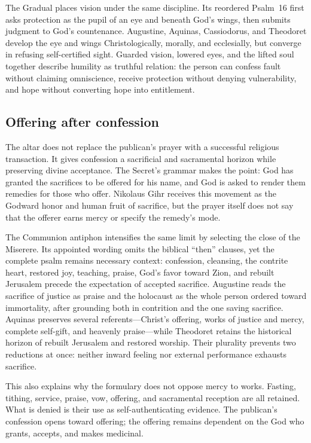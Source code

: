 The Gradual places vision under the same discipline.  Its reordered Psalm~16
first asks protection as the pupil of an eye and beneath God's wings, then
submits judgment to God's countenance.  Augustine, Aquinas, Cassiodorus, and
Theodoret develop the eye and wings Christologically, morally, and
ecclesially, but converge in refusing self-certified sight.  Guarded vision,
lowered eyes, and the lifted soul together describe humility as truthful
relation: the person can confess fault without claiming omniscience, receive
protection without denying vulnerability, and hope without converting hope
into entitlement.

\subsection*{Offering after confession}

The altar does not replace the publican's prayer with a successful religious
transaction.  It gives confession a sacrificial and sacramental horizon while
preserving divine acceptance.  The Secret's grammar makes the point: God has
granted the sacrifices to be offered for his name, and God is asked to render
them remedies for those who offer.  Nikolaus Gihr receives this movement as
the Godward honor and human fruit of sacrifice, but the prayer itself does not
say that the offerer earns mercy or specify the remedy's mode.

The Communion antiphon intensifies the same limit by selecting the close of
the Miserere.  Its appointed wording omits the biblical ``then'' clauses, yet
the complete psalm remains necessary context: confession, cleansing, the
contrite heart, restored joy, teaching, praise, God's favor toward Zion, and
rebuilt Jerusalem precede the expectation of accepted sacrifice.  Augustine
reads the sacrifice of justice as praise and the holocaust as the whole person
ordered toward immortality, after grounding both in contrition and the one
saving sacrifice.  Aquinas preserves several referents---Christ's offering,
works of justice and mercy, complete self-gift, and heavenly praise---while
Theodoret retains the historical horizon of rebuilt Jerusalem and restored
worship.  Their plurality prevents two reductions at once: neither inward
feeling nor external performance exhausts sacrifice.

This also explains why the formulary does not oppose mercy to works.  Fasting,
tithing, service, praise, vow, offering, and sacramental reception are all
retained.  What is denied is their use as self-authenticating evidence.  The
publican's confession opens toward offering; the offering remains dependent
on the God who grants, accepts, and makes medicinal.

